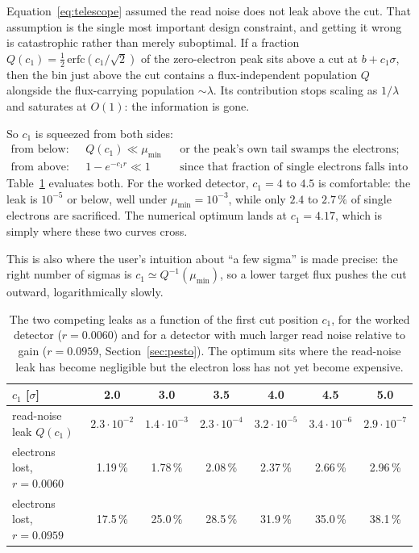 \documentclass[11pt,a4paper]{article}
\begin{document}
Equation~\eqref{eq:telescope} assumed the read noise does not leak above the
cut. That assumption is the single most important design constraint, and
getting it wrong is catastrophic rather than merely suboptimal. If a fraction
$Q(c_1) = \tfrac12\,\mathrm{erfc}(c_1/\sqrt2)$ of the zero-electron peak sits
above a cut at $b + c_1\sigma$, then the bin just above the cut contains a
flux-independent population $Q$ alongside the flux-carrying population
$\sim\!\lambda$. Its contribution stops scaling as $1/\lambda$ and saturates at
$O(1)$: the information is gone.

So $c_1$ is squeezed from both sides:
\begin{align}
  \text{from below:}\quad & Q(c_1) \ll \mu_{\min}
    && \text{or the peak's own tail swamps the electrons;}\\
  \text{from above:}\quad & 1 - e^{-c_1 r} \ll 1
    && \text{since that fraction of single electrons falls into bin 0.}
\end{align}
Table~\ref{tab:firstcut} evaluates both. For the worked detector, $c_1 = 4$ to
$4.5$ is comfortable: the leak is $10^{-5}$ or below, well under
$\mu_{\min}=10^{-3}$, while only $2.4$ to $2.7\,\%$ of single electrons are
sacrificed. The numerical optimum lands at $c_1 = 4.17$, which is simply where
these two curves cross.

This is also where the user's intuition about ``a few sigma'' is made precise:
the right number of sigmas is $c_1 \simeq Q^{-1}(\mu_{\min})$, so a lower
target flux pushes the cut outward, logarithmically slowly.

\begin{table}[h]
\centering
\small
\caption{The two competing leaks as a function of the first cut position
$c_1$, for the worked detector ($r=0.0060$) and for a detector with much
larger read noise relative to gain ($r=0.0959$, Section~\ref{sec:pesto}).
The optimum sits where the read-noise leak has become negligible but the
electron loss has not yet become expensive.}
\label{tab:firstcut}
\setlength{\tabcolsep}{4pt}
\begin{tabular}{lcccccc}
\toprule
$c_1$ [$\sigma$] & 2.0 & 3.0 & 3.5 & 4.0 & 4.5 & 5.0\\
\midrule
read-noise leak $Q(c_1)$ & $2.3{\cdot}10^{-2}$ & $1.4{\cdot}10^{-3}$ & $2.3{\cdot}10^{-4}$ & $3.2{\cdot}10^{-5}$ & $3.4{\cdot}10^{-6}$ & $2.9{\cdot}10^{-7}$\\
electrons lost, $r=0.0060$ & 1.19\,\% & 1.78\,\% & 2.08\,\% & 2.37\,\% & 2.66\,\% & 2.96\,\%\\
electrons lost, $r=0.0959$ & 17.5\,\% & 25.0\,\% & 28.5\,\% & 31.9\,\% & 35.0\,\% & 38.1\,\%\\
\bottomrule
\end{tabular}
\end{table}
\end{document}
